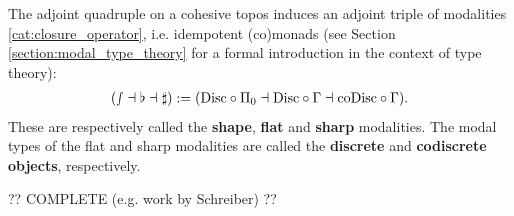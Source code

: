     \begin{property}\label{topos:cohesive_modalities}
        The adjoint quadruple on a cohesive topos induces an adjoint triple of modalities \ref{cat:closure_operator}, i.e. idempotent (co)monads (see Section \ref{section:modal_type_theory} for a formal introduction in the context of type theory):
        \begin{gather}
            (\smallint\dashv\flat\dashv\sharp):=(\mathrm{Disc}\circ\Pi_0\dashv\mathrm{Disc}\circ\Gamma\dashv\mathrm{coDisc}\circ\Gamma).
        \end{gather}
        These are respectively called the \textbf{shape}, \textbf{flat} and \textbf{sharp} modalities. The modal types of the flat and sharp modalities are called the \textbf{discrete} and \textbf{codiscrete objects}, respectively.
    \end{property}

    ?? COMPLETE (e.g. work by Schreiber) ??